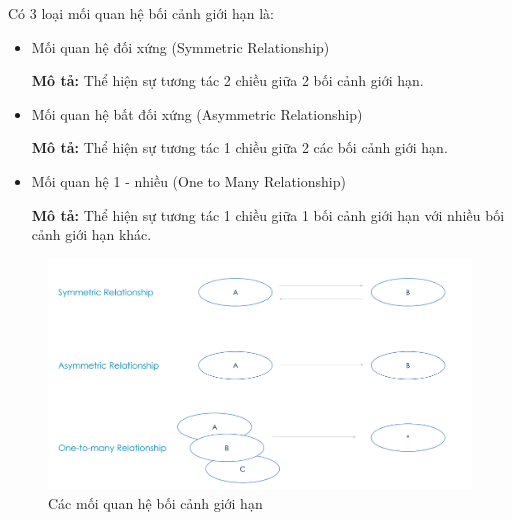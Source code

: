 Có 3 loại mối quan hệ bối cảnh giới hạn là:

\begin{itemize}
    \item Mối quan hệ đối xứng (Symmetric Relationship)
          
    \textbf{Mô tả:}  Thể hiện sự tương tác 2 chiều giữa 2    bối cảnh giới hạn.   

    \item Mối quan hệ bất đối xứng (Asymmetric Relationship)
          
    \textbf{Mô tả:}  Thể hiện sự tương tác 1 chiều giữa 2  các bối cảnh giới hạn.   

    \item Mối quan hệ 1 - nhiều (One to Many Relationship)
          
    \textbf{Mô tả:}  Thể hiện sự tương tác 1 chiều giữa 1    bối cảnh giới hạn với nhiều     bối cảnh giới hạn khác.   

\end{itemize}

\begin{figure}[H]

      \centering
      
      \includegraphics[scale = 0.5]{pictures/cac_moi_quan_he_boi_canh_gioi_han/main.png}
      
      \caption{Các mối quan hệ bối cảnh giới hạn}
      
      \end{figure}
      